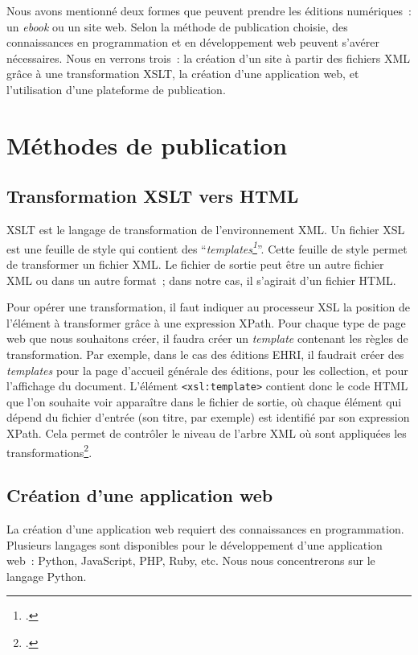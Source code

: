 
Nous avons mentionné deux formes que peuvent prendre les éditions numériques~: un \textit{ebook} ou un site web. Selon la méthode de publication choisie, des connaissances en programmation et en développement web peuvent s'avérer nécessaires. Nous en verrons trois~: la création d'un site à partir des fichiers XML grâce à une transformation XSLT, la création d'une application web, et l'utilisation d'une plateforme de publication.    


\section{Méthodes de publication}

\subsection{Transformation XSLT vers HTML}
XSLT est le langage de transformation de l'environnement XML. Un fichier XSL est une feuille de style qui contient des \enquote{\textit{templates\footcite[chapitre 8]{HaroldMeans2002}}}. Cette feuille de style permet de transformer un fichier XML. Le fichier de sortie peut être un autre fichier XML ou dans un autre format~; dans notre cas, il s'agirait d'un fichier HTML.  

Pour opérer une transformation, il faut indiquer au processeur XSL la position de l'élément à transformer grâce à une expression XPath. Pour chaque type de page web que nous souhaitons créer, il faudra créer un \textit{template} contenant les règles de transformation. Par exemple, dans le cas des éditions EHRI, il faudrait créer des \textit{templates} pour la page d'accueil générale des éditions, pour les collection, et pour l'affichage du document. L'élément \texttt{<xsl:template>} contient donc le code HTML que l'on souhaite voir apparaître dans le fichier de sortie, où chaque élément qui dépend du fichier d'entrée (son titre, par exemple) est identifié par son expression XPath. Cela permet de contrôler le niveau de l'arbre XML où sont appliquées les transformations\footcite[chapitre 8]{HaroldMeans2002}.


\subsection{Création d'une application web}
La création d'une application web requiert des connaissances en programmation. Plusieurs langages sont disponibles pour le développement d'une application web~: Python, JavaScript, PHP, Ruby, etc. Nous nous concentrerons sur le langage Python.  


